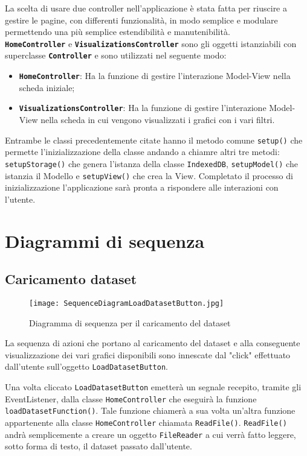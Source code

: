 La scelta di usare due controller nell'applicazione è stata fatta per riuscire a gestire le pagine, con differenti funzionalità, in modo semplice e modulare permettendo una più semplice estendibilità e manutenibilità.\\
\textbf{\texttt{HomeController}} e \textbf{\texttt{VisualizationsController}} sono gli oggetti istanziabili con superclasse \textbf{\texttt{Controller}} e sono utilizzati nel seguente modo:
\begin{itemize}
	\item \textbf{\texttt{HomeController}}: Ha la funzione di gestire l'interazione Model-View nella scheda iniziale;
	\item \textbf{\texttt{VisualizationsController}}: Ha la funzione di gestire l'interazione Model-View nella scheda in cui vengono visualizzati i grafici con i vari filtri.
\end{itemize}
Entrambe le classi precedentemente citate hanno il metodo comune \texttt{setup()} che permette l'inizializzazione della classe andando a chiamre altri tre metodi: \texttt{setupStorage()} che genera l'istanza della classe \texttt{IndexedDB}, \texttt{setupModel()} che istanzia il Modello e \texttt{setupView()} che crea la View. Completato il processo di inizializzazione l'applicazione sarà pronta a rispondere alle interazioni con l'utente.

\section{Diagrammi di sequenza}
\subsection{Caricamento dataset}
\begin{figure}[H]
	\centering
	\texttt{[image: SequenceDiagramLoadDatasetButton.jpg]}
	\caption{Diagramma di sequenza per il caricamento del dataset}
  \end{figure}
  La sequenza di azioni che portano al caricamento del dataset e alla conseguente visualizzazione dei vari grafici disponibili sono innescate dal "click" effettuato dall'utente sull'oggetto \texttt{LoadDatasetButton}.

Una volta cliccato \texttt{LoadDatasetButton} emetterà un segnale recepito, tramite gli EventListener, dalla classe \texttt{HomeController} che eseguirà la funzione\\ \texttt{loadDatasetFunction()}. Tale funzione chiamerà a sua volta un'altra funzione appartenente alla classe \texttt{HomeController} chiamata \texttt{ReadFile()}.
\texttt{ReadFile()} andrà semplicemente a creare un oggetto \texttt{FileReader} a cui verrà fatto leggere, sotto forma di testo, il dataset passato dall'utente.

